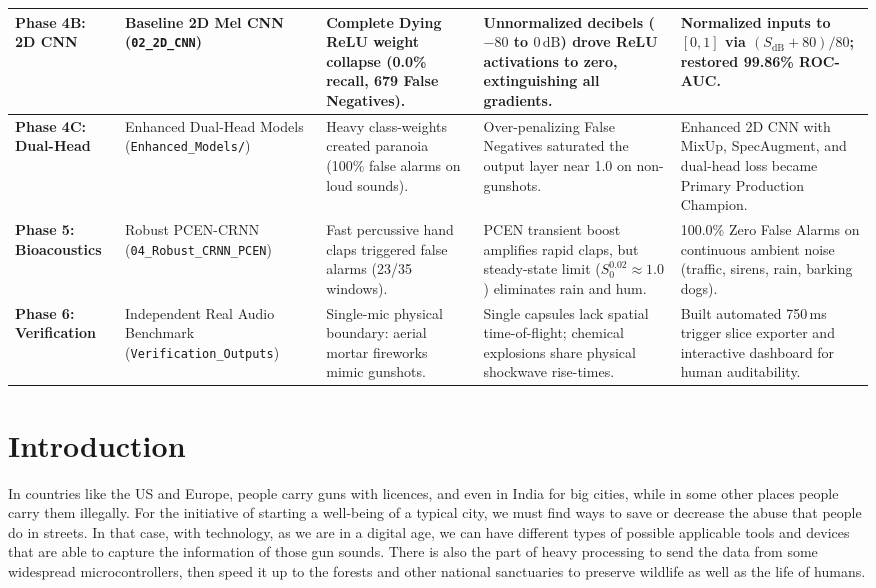 \documentclass[conference]{IEEEtran}
\begin{document}
\begin{table}[!t]
\begin{tabular}{lp{3.2cm}p{3.5cm}p{3.8cm}p{3.5cm}}
\midrule
\textbf{Phase 4B: 2D CNN} & Baseline 2D Mel CNN (\texttt{02\_2D\_CNN}) & Complete Dying ReLU weight collapse (0.0\% recall, 679 False Negatives). & Unnormalized decibels ($-80$ to $0\,\text{dB}$) drove ReLU activations to zero, extinguishing all gradients. & Normalized inputs to $[0, 1]$ via $(S_{\text{dB}} + 80)/80$; restored 99.86\% ROC-AUC. \\
\midrule
\textbf{Phase 4C: Dual-Head} & Enhanced Dual-Head Models (\texttt{Enhanced\_Models/}) & Heavy class-weights created paranoia (100\% false alarms on loud sounds). & Over-penalizing False Negatives saturated the output layer near 1.0 on non-gunshots. & Enhanced 2D CNN with MixUp, SpecAugment, and dual-head loss became Primary Production Champion. \\
\midrule
\textbf{Phase 5: Bioacoustics} & Robust PCEN-CRNN (\texttt{04\_Robust\_CRNN\_PCEN}) & Fast percussive hand claps triggered false alarms (23/35 windows). & PCEN transient boost amplifies rapid claps, but steady-state limit ($S_0^{0.02} \approx 1.0$) eliminates rain and hum. & 100.0\% Zero False Alarms on continuous ambient noise (traffic, sirens, rain, barking dogs). \\
\midrule
\textbf{Phase 6: Verification} & Independent Real Audio Benchmark (\texttt{Verification\_Outputs}) & Single-mic physical boundary: aerial mortar fireworks mimic gunshots. & Single capsules lack spatial time-of-flight; chemical explosions share physical shockwave rise-times. & Built automated 750\,ms trigger slice exporter and interactive dashboard for human auditability. \\
\bottomrule
\end{tabular}
\end{table}

\section{Introduction}
\label{sec:introduction}

In countries like the US and Europe, people carry guns with licences, and even in India for big cities, while in some other places people carry them illegally. For the initiative of starting a well-being of a typical city, we must find ways to save or decrease the abuse that people do in streets. In that case, with technology, as we are in a digital age, we can have different types of possible applicable tools and devices that are able to capture the information of those gun sounds. There is also the part of heavy processing to send the data from some widespread microcontrollers, then speed it up to the forests and other national sanctuaries to preserve wildlife as well as the life of humans.
\end{document}
